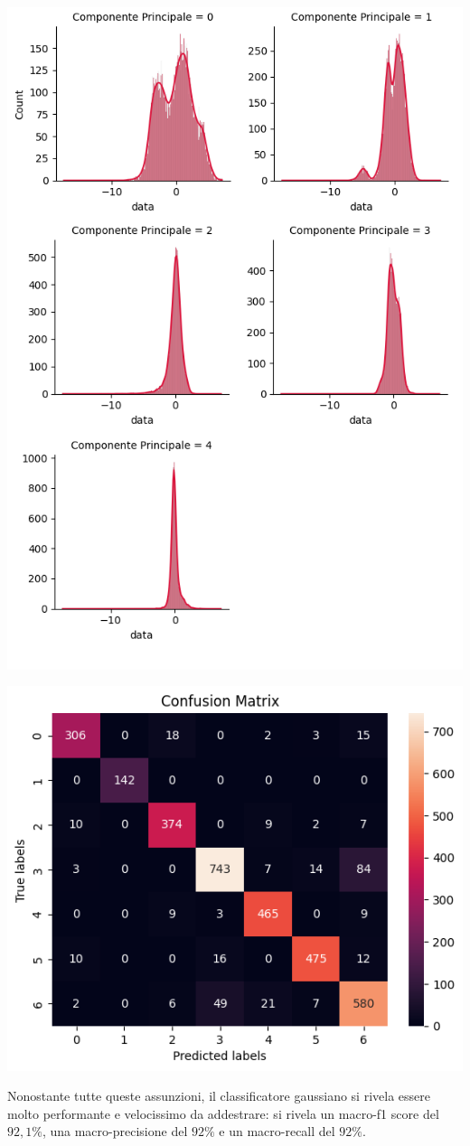 \begin{Figure}
    \centering
    \includegraphics[width=0.85\linewidth]{img/components_distribution.png}
\end{Figure}

\begin{Figure}
    \centering
    \includegraphics[width=\linewidth]{img/gnb_confusion_matrix.png}
\end{Figure}

Nonostante tutte queste assunzioni, il classificatore gaussiano si rivela essere
molto performante e velocissimo da addestrare:
si rivela un macro-f1 score del $92,1\%$, 
una macro-precisione del $92\%$ e un macro-recall del $92\%$.
